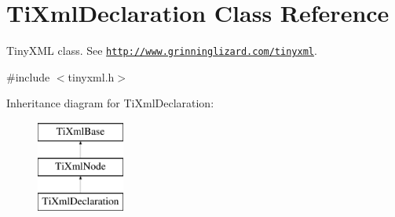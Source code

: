 \hypertarget{class_ti_xml_declaration}{}\section{Ti\+Xml\+Declaration Class Reference}
\label{class_ti_xml_declaration}


Tiny\+X\+ML class. See \href{http://www.grinninglizard.com/tinyxml}{\tt http\+://www.\+grinninglizard.\+com/tinyxml}.  




{\ttfamily \#include $<$tinyxml.\+h$>$}

Inheritance diagram for Ti\+Xml\+Declaration\+:\begin{figure}[H]
\begin{center}
\leavevmode
\includegraphics[height=3.000000cm]{class_ti_xml_declaration}
\end{center}
\end{figure}
